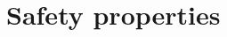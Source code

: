 \documentclass[11pt,twoside]{scrartcl}
\begin{document}

\section{Safety properties}
\end{document}
